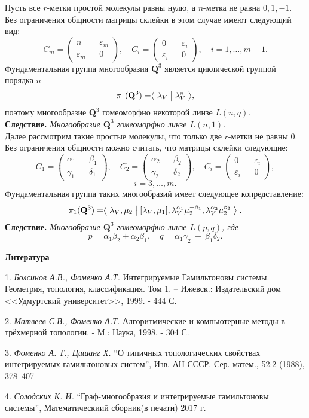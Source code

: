 Пусть все $r$-метки простой молекулы равны нулю, а $n$-метка не равна $0, 1, -1$.
Без ограничения общности матрицы склейки в этом случае имеют следующий вид:
$$
C_m = \begin{pmatrix} n && \varepsilon_m \\ \varepsilon_m && 0 \end{pmatrix}, \quad C_i = \begin{pmatrix} 0 && \varepsilon_i \\ \varepsilon_i && 0 \end{pmatrix},\quad i = 1,\dots, m-1.
$$
Фундаментальная группа многообразия $\mathbf{Q}^3$ является циклической группой порядка $n$
$$
\pi_1(\mathbf{Q}^3) = \bigm\langle \lambda_V \bigm| \lambda_V^n \bigm\rangle,
$$
поэтому многообразие $\mathbf{Q}^3$ гомеоморфно некоторой линзе $L(n, q)$.
\\

\textbf{Следствие.}{ \it
Многообразие $\mathbf{Q}^3$ гомеоморфно линзе $L(n, 1)$.}
\\

Далее рассмотрим такие простые молекулы, что только две $r$-метки не равны 0.
Без ограничения общности можно считать, что матрицы склейки следующие:
$$
C_1 = \begin{pmatrix} \alpha_1 && \beta_1 \\ \gamma_1 && \delta_1 \end{pmatrix}, \quad
C_2 = \begin{pmatrix} \alpha_2 && \beta_2 \\ \gamma_2 && \delta_2 \end{pmatrix},
\quad C_i = \begin{pmatrix} 0 && \varepsilon_i \\ \varepsilon_i && 0 \end{pmatrix},
$$
$$
i = 3,\dots, m.
$$
Фундаментальная группа таких многообразий имеет следующее копредставление:
$$
\pi_1(\mathbf{Q}^3) = \bigm\langle \lambda_V, \mu_2 \bigm|  [\lambda_V, \mu_1],
\lambda^{\alpha_1}_V\mu^{-\beta_1}_2, \lambda^{\alpha_2}_V\mu^{\beta_2}_2 \bigm\rangle.
$$
\textbf{Следствие.} {\it
Многообразие $\mathbf{Q}^3$ гомеоморфно линзе $L(p, q)$, где
}
$$
p = \alpha_1\beta_2 + \alpha_2\beta_1, \quad q = \alpha_1\gamma_2~+~\beta_1\delta_2.
$$

\smallskip \centerline{\bf Литература}\nopagebreak

1. {\it Болсинов А.В., Фоменко А.Т.}  Интегрируемые Гамильтоновы системы. Геометрия, топология, классификация. Том 1. -- Ижевск.: Издательский дом <<Удмуртский университет>>, 1999. - 444 С.

2. {\it Матвеев С.В., Фоменко А.Т.} Алгоритмические и компьютерные методы в трёхмерной топологии.  - М.: Наука, 1998. - 304 С.

3. {\it Фоменко А. Т., Цишанг Х.} “О типичных топологических свойствах интегрируемых гамильтоновых систем”, Изв. АН СССР. Сер. матем., 52:2 (1988), 378–407

4. {\it Солодских К. И.} “Граф-многообразия и интегрируемые гамильтоновы системы”, Математическиий сборник(в печати) 2017 г.

